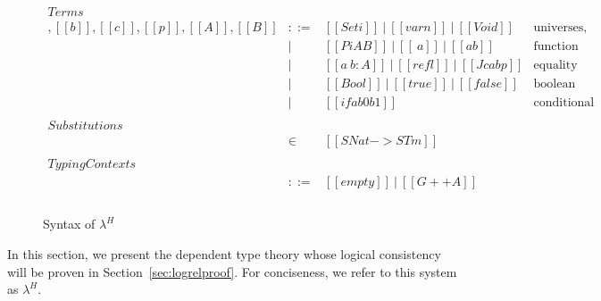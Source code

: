 \documentclass[acmsmall,screen=true,
\ifpublic review=false\else,review=true\fi
  ,anonymous=\ifanonymous true\else false\fi]{acmart}
\newcommand{\lang}{$\lambda^H$\xspace}
\newcommand{\scw}[1]{}
\newcommand{\yl}[1]{}
\begin{document}
\begin{figure}[h]
\[
\begin{array}{lcll}
\mathit{Terms}\\
[[a]],[[b]],[[c]],[[p]],[[A]],[[B]] & ::= & [[Set i]]\ |\ [[var n]]\  |\ [[Void]]
                  & \mbox{universes, variables, empty type} \\
            & |   & [[Pi A B]]\ |\ [[\ a]]\ |\ [[a b]]
                  & \mbox{function types, abstractions, applications} \\
            & |   & [[a ~ b : A ]]\ |\  [[refl]]\ |\ [[J c a b p]]
                  & \mbox{equality types, reflexivity proof, J eliminator} \\
            & |   & [[Bool]]\ |\  [[true]]\ |\  [[false]]\ %
                  & \mbox{boolean type, true, false} \\
            & |   & [[if a b0 b1]]
                  & \mbox{conditional expression} \\ \\
\mathit{Substitutions}\\
[[rho]] & \in & [[SNat -> STm]] & \\ \\ 
\mathit{Typing Contexts}\\
 [[G]]       & ::= & [[empty]]\ |\ [[G ++ A]] &  \\ \\
\end{array}
\]
  \caption{Syntax of \lang \scw{Where does the name come from?}\yl{H =
    hierarchy though it needs a better name}}
  \label{fig:syntax}
\end{figure}


In this section, we present the dependent type theory whose logical
consistency will be proven in Section~\ref{sec:logrelproof}. For conciseness,
we refer to this system as \lang.
\end{document}
